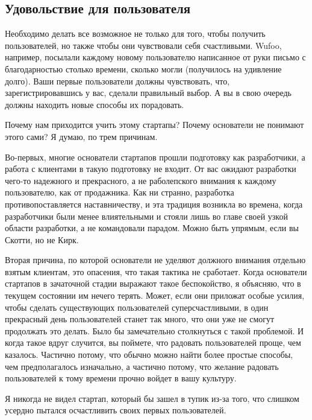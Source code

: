 \documentclass[ebook,12pt,oneside,openany]{memoir}
\begin{document}
\subsection{Удовольствие для пользователя}

Необходимо делать все возможное не только для того, чтобы получить
пользователей, но также чтобы они чувствовали себя счастливыми. Wufoo,
например, посылали каждому новому пользователю написанное от руки
письмо с благодарностью столько времени, сколько могли (получилось на
удивление долго). Ваши первые пользователи должны чувствовать, что,
зарегистрировавшись у вас, сделали правильный выбор. А вы в свою
очередь должны находить новые способы их порадовать. \newline

Почему нам приходится учить этому стартапы? Почему основатели не
понимают этого сами? Я думаю, по трем причинам. \newline

Во-первых, многие основатели стартапов прошли подготовку как
разработчики, а работа с клиентами в такую подготовку не входит. От
вас ожидают разработки чего-то надежного и прекрасного, а не
раболепского внимания к каждому пользователю, как от продажника. Как
ни странно, разработка противопоставляется наставничеству, и эта
традиция возникла во времена, когда разработчики были менее
влиятельными и стояли лишь во главе своей узкой области разработки, а
не командовали парадом. Можно быть упрямым, если вы Скотти, но не
Кирк. \newline

Вторая причина, по которой основатели не уделяют должного внимания
отдельно взятым клиентам, это опасения, что такая тактика не
сработает. Когда основатели стартапов в зачаточной стадии выражают
такое беспокойство, я объясняю, что в текущем состоянии им нечего
терять. Может, если они приложат особые усилия, чтобы сделать
существующих пользователей суперсчастливыми, в один прекрасный день
пользователей станет так много, что они уже не смогут продолжать это
делать. Было бы замечательно столкнуться с такой проблемой. И когда
такое вдруг случится, вы поймете, что радовать пользователей проще,
чем казалось. Частично потому, что обычно можно найти более простые
способы, чем предполагалось изначально, а частично потому, что желание
радовать пользователей к тому времени прочно войдет в вашу культуру. \newline

Я никогда не видел стартап, который бы зашел в тупик из-за того, что
слишком усердно пытался осчастливить своих первых пользователей. \newline
\end{document}
